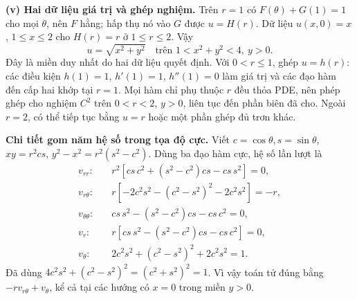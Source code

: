 \documentclass[10pt,a4paper]{article}
\begin{document}
\textbf{(v) Hai dữ liệu giá trị và ghép nghiệm.} Trên $r=1$ có $F(\theta)+G(1)=1$ cho mọi $\theta$, nên $F$ hằng; hấp thụ nó vào $G$ được $u=H(r)$. Dữ liệu $u(x,0)=x$, $1\le x\le2$ cho $H(r)=r$ ở $1\le r\le2$. Vậy
\[\boxed{u=\sqrt{x^2+y^2}\quad\text{trên }1<x^2+y^2<4,\ y>0.}\]
Đây là miền duy nhất do hai dữ liệu quyết định. Với $0<r\le1$, ghép $u=h(r)$: các điều kiện $h(1)=1$, $h'(1)=1$, $h''(1)=0$ làm giá trị và các đạo hàm đến cấp hai khớp tại $r=1$. Mọi hàm chỉ phụ thuộc $r$ đều thỏa PDE, nên phép ghép cho nghiệm $C^2$ trên $0<r<2$, $y>0$, liên tục đến phần biên đã cho. Ngoài $r=2$, có thể tiếp tục bằng $u=r$ hoặc một phần ghép đủ trơn khác.

\textbf{Chi tiết gom năm hệ số trong tọa độ cực.} Viết $c=\cos\theta,s=\sin\theta$, $xy=r^2cs$, $y^2-x^2=r^2(s^2-c^2)$. Dùng ba đạo hàm cực, hệ số lần lượt là
\[\begin{aligned}
v_{rr}:&\quad r^2[cs\,c^2+(s^2-c^2)cs-cs\,s^2]=0,\\
v_{r\theta}:&\quad r[-2c^2s^2-(c^2-s^2)^2-2c^2s^2]=-r,\\
v_{\theta\theta}:&\quad cs\,s^2-(s^2-c^2)cs-cs\,c^2=0,\\
v_r:&\quad r[cs\,s^2-(s^2-c^2)cs-cs\,c^2]=0,\\
v_\theta:&\quad 2c^2s^2+(c^2-s^2)^2+2c^2s^2=1.
\end{aligned}\]
Đã dùng $4c^2s^2+(c^2-s^2)^2=(c^2+s^2)^2=1$. Vì vậy toán tử đúng bằng $-rv_{r\theta}+v_\theta$, kể cả tại các hướng có $x=0$ trong miền $y>0$.
\end{document}
